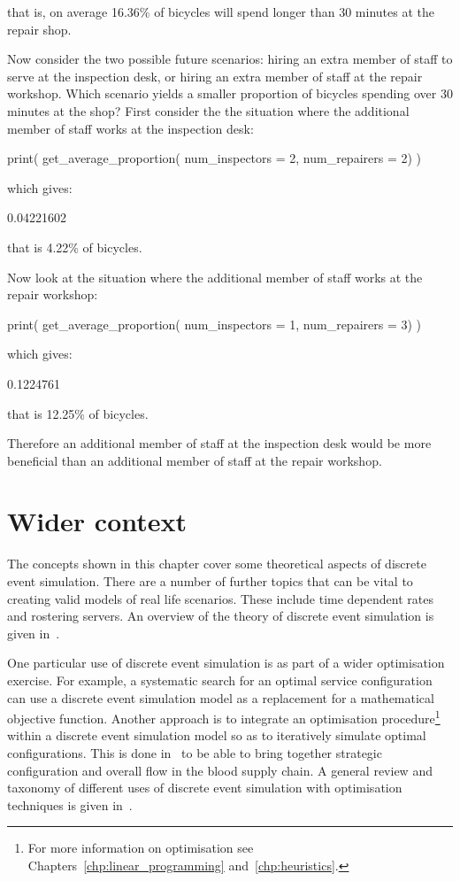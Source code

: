 that is, on average 16.36\% of bicycles will spend longer than 30 minutes at the
repair shop.

Now consider the two possible future scenarios: hiring an
extra member of staff to serve at the inspection desk, or hiring an extra member
of staff at the repair workshop. Which scenario yields a smaller proportion of
bicycles spending over 30 minutes at the shop? First consider the
the situation where the additional member of staff works at the inspection desk:

\begin{Rin}
print(
  get_average_proportion(
    num_inspectors = 2,
    num_repairers = 2)
)
\end{Rin}

which gives:

\begin{Rout}
[1] 0.04221602
\end{Rout}

that is 4.22\% of bicycles.

Now look at the situation where the additional member of staff works at the
repair workshop:

\begin{Rin}
print(
  get_average_proportion(
    num_inspectors = 1,
    num_repairers = 3)
)
\end{Rin}

which gives:

\begin{Rout}
[1] 0.1224761
\end{Rout}

that is 12.25\% of bicycles.

Therefore an additional member of staff at the inspection desk would be more
beneficial than an additional member of staff at the repair workshop.

\section{Wider context}\label{sec:wider_context}

The concepts shown in this chapter cover some theoretical aspects of discrete
event simulation. There are a number of further topics that can be vital to
creating valid models of real life scenarios. These include time dependent rates
and rostering servers. An overview of the theory of discrete event simulation is
given in~\parencite{robinson2004simulation}.

One particular use of discrete event simulation is as part of a wider
optimisation exercise. For example, a systematic search for an optimal service
configuration can use a discrete event simulation model as a replacement for a
mathematical objective function. Another approach is to integrate an
optimisation procedure\footnote{For more information on optimisation see
Chapters~\ref{chp:linear_programming} and~\ref{chp:heuristics}.} within a
discrete event simulation model so as to iteratively simulate optimal
configurations. This is done in~\parencite{osorio2017simulation} to be able to
bring together strategic configuration and overall flow in the blood supply
chain. A general review and taxonomy of different uses of discrete event
simulation with optimisation techniques is given
in~\parencite{figueira2014hybrid}.

